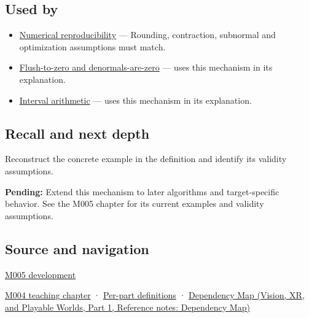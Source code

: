 \subsection{Used by}\label{appendix-f11d1a521253-used-by}

\hypertarget{appendix-f11d1a521253-used-by}{}

\begin{itemize}
\item
  \hyperref[appendix-5f1a2c3f97ff]{Numerical reproducibility} --- Rounding, contraction, subnormal and optimization assumptions must match.
\item
  \hyperref[appendix-e979eb012782]{Flush-to-zero and denormals-are-zero} --- uses this mechanism in its explanation.
\item
  \hyperref[appendix-1823a14330cb]{Interval arithmetic} --- uses this mechanism in its explanation.
\end{itemize}

\subsection{Recall and next depth}\label{appendix-f11d1a521253-recall-and-next-depth}

\hypertarget{appendix-f11d1a521253-recall-and-next-depth}{}

Reconstruct the concrete example in the definition and identify its validity assumptions.

\textbf{Pending:} Extend this mechanism to later algorithms and target-specific behavior. See the M005 chapter for its current examples and validity assumptions.

\subsection{Source and navigation}\label{appendix-f11d1a521253-source-and-navigation}

\hypertarget{appendix-f11d1a521253-source-and-navigation}{}

\hyperref[01-foundations-i-ch001-when-arithmetic-meets-uncertainty]{M005 development}

\hyperref[01-foundations-i-ch001-a-stretching-ruler-for-real-valued-quantities]{M004 teaching chapter} · \hyperref[appendix-fd090d982a15-m004---parts-61-76]{Per-part definitions} · \href{../07-Vision-XR-and-Playable-Worlds-P01/main.pdf\#appendix-4ad47bdd269a}{Dependency Map (Vision, XR, and Playable Worlds, Part 1, Reference notes: Dependency Map)}
